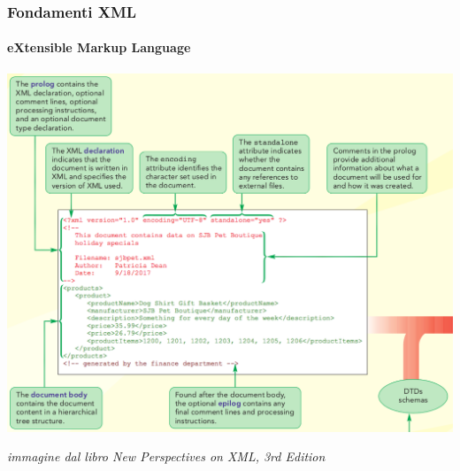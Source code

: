 \begin{frame}
	\frametitle{Fondamenti XML}
	\framesubtitle{eXtensible Markup Language}
	\addtocounter{nframe}{1}

	\begin{center}
		\includegraphics[width=.8\textwidth]{imgs/xml-intro-doc-xml.png}
	\end{center}

	\begin{tiny}\textit{immagine dal libro New Perspectives on XML, 3rd Edition}\end{tiny}

\end{frame}


